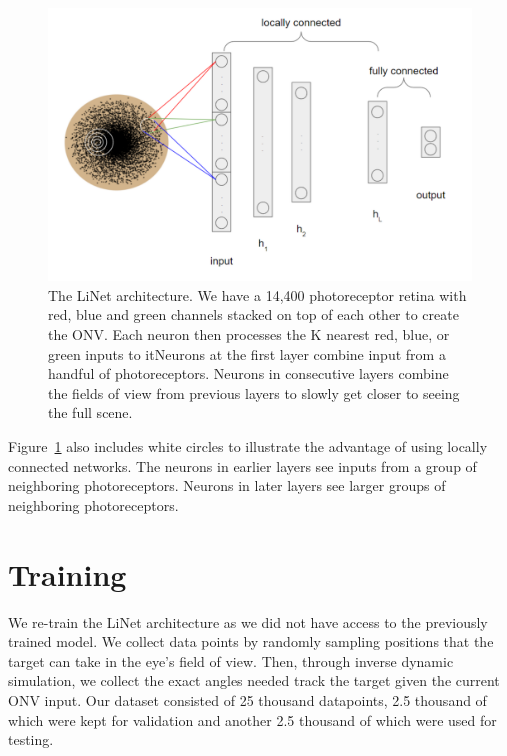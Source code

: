 \documentclass [MS] {UCLAthesis}
\begin{document}
\begin{figure}
    \centering
    \includegraphics[width=\textwidth]{linet_summary}
    \caption[LiNet architecture summary]{The LiNet architecture. We have a 14,400 photoreceptor retina with red, blue and green channels stacked on top of each other to create the ONV. Each neuron then processes the K nearest red, blue, or green inputs to itNeurons at the first layer combine input from a handful of photoreceptors. Neurons in consecutive layers combine the fields of view from previous layers to slowly get closer to seeing the full scene.}
    \label{fig:linet_rgb}
\end{figure}

Figure~\ref{fig:linet_rgb} also includes white circles to illustrate the advantage of using locally connected networks. The neurons in earlier layers see inputs from a group of neighboring photoreceptors. Neurons in later layers see larger groups of neighboring photoreceptors.



\section{Training}

We re-train the LiNet architecture as we did not have access to the previously trained model. We collect data points by randomly sampling positions that the target can take in the eye's field of view. Then, through inverse dynamic simulation, we collect the exact angles needed track the target given the current ONV input. Our dataset consisted of 25 thousand datapoints, 2.5 thousand of which were kept for validation and another 2.5 thousand of which were used for testing. 
\end{document}
